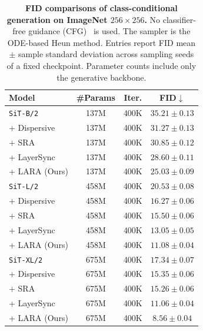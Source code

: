\begin{table}[!t]
\centering
\begin{minipage}[t]{0.485\textwidth}
\centering
\caption{\textbf{FID comparisons of class-conditional generation on ImageNet $256\times256$.} No classifier-free guidance (CFG)~\citep{ho2022classifier} is used. The sampler is the ODE-based Heun method. Entries report FID mean $\pm$ sample standard deviation across sampling seeds of a fixed checkpoint. Parameter counts include only the generative backbone.}
\label{tab:imagenet_no_cfg}
\begingroup
\footnotesize
\setlength{\tabcolsep}{4pt}
\renewcommand{\arraystretch}{0.88}
\begin{tabular*}{\linewidth}{@{\extracolsep{\fill}}lccc@{}}
            \toprule
            Model & \#Params & Iter. & FID$\downarrow$ \\
            \midrule
            \texttt{SiT-B/2} & 137M & 400K & $35.21 \pm 0.13$ \\
            \quad + Dispersive & 137M & 400K & $31.27 \pm 0.13$ \\
            \quad + SRA & 137M & 400K & $30.85 \pm 0.12$ \\
            \quad + LayerSync & 137M & 400K & $28.60 \pm 0.11$ \\
            \quad + LARA (Ours) & 137M & 400K & $\mathbf{25.03 \pm 0.09}$ \\
            \midrule
            \texttt{SiT-L/2} & 458M & 400K & $20.53 \pm 0.08$ \\
            \quad + Dispersive & 458M & 400K & $16.27 \pm 0.06$ \\
            \quad + SRA & 458M & 400K & $15.50 \pm 0.06$ \\
            \quad + LayerSync & 458M & 400K & $13.05 \pm 0.05$ \\
            \quad + LARA (Ours) & 458M & 400K & $\mathbf{11.08 \pm 0.04}$ \\
            \midrule
            \texttt{SiT-XL/2} & 675M & 400K & $17.34 \pm 0.07$ \\
            \quad + Dispersive & 675M & 400K & $15.35 \pm 0.06$ \\
            \quad + SRA & 675M & 400K & $15.26 \pm 0.06$ \\
            \quad + LayerSync & 675M & 400K & $11.06 \pm 0.04$ \\
            \quad + LARA (Ours) & 675M & 400K & $\mathbf{8.56 \pm 0.04}$ \\
            \midrule

\end{tabular*}
\end{minipage}
\end{table}
